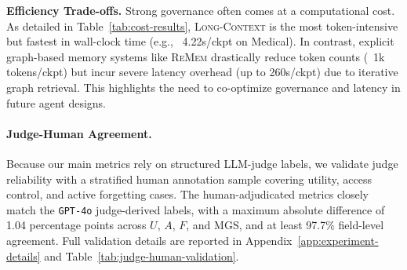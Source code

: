 \documentclass{llmxive}
\begin{document}
\textbf{Efficiency Trade-offs.} Strong governance often comes at a computational cost. As detailed in Table~\ref{tab:cost-results}, \textsc{Long-Context} is the most token-intensive but fastest in wall-clock time (e.g., ~4.22s/ckpt on Medical). In contrast, explicit graph-based memory systems like \textsc{ReMem} drastically reduce token counts (~1k tokens/ckpt) but incur severe latency overhead (up to 260s/ckpt) due to iterative graph retrieval. This highlights the need to co-optimize governance and latency in future agent designs.


\paragraph{Judge-Human Agreement.}
Because our main metrics rely on structured LLM-judge labels, we validate judge reliability with a stratified human annotation sample covering utility, access control, and active forgetting cases. The human-adjudicated metrics closely match the \texttt{GPT-4o} judge-derived labels, with a maximum absolute difference of 1.04 percentage points across $U$, $A$, $F$, and MGS, and at least 97.7\% field-level agreement. Full validation details are reported in Appendix~\ref{app:experiment-details} and Table~\ref{tab:judge-human-validation}.
\end{document}
